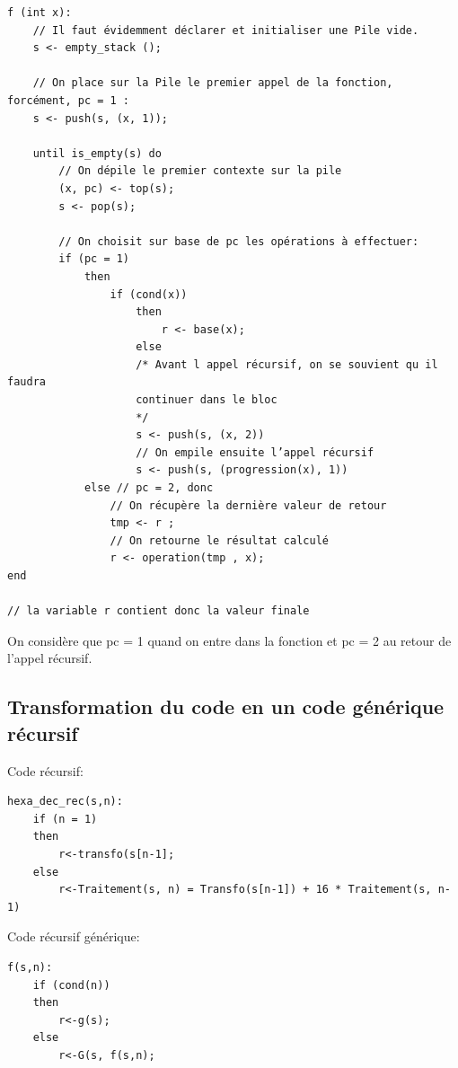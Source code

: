 \documentclass[a4paper, 11pt, oneside]{article}
\begin{document}
\begin{lstlisting}
f (int x):
    // Il faut évidemment déclarer et initialiser une Pile vide.
    s <- empty_stack ();

    // On place sur la Pile le premier appel de la fonction, forcément, pc = 1 :
    s <- push(s, (x, 1));

    until is_empty(s) do
        // On dépile le premier contexte sur la pile
        (x, pc) <- top(s);
        s <- pop(s);

        // On choisit sur base de pc les opérations à effectuer:
        if (pc = 1)
            then
                if (cond(x))
                    then
                        r <- base(x);
                    else
                    /* Avant l appel récursif, on se souvient qu il faudra
                    continuer dans le bloc
                    */
                    s <- push(s, (x, 2))
                    // On empile ensuite l’appel récursif
                    s <- push(s, (progression(x), 1))
            else // pc = 2, donc
                // On récupère la dernière valeur de retour
                tmp <- r ;
                // On retourne le résultat calculé
                r <- operation(tmp , x);
end

// la variable r contient donc la valeur finale
\end{lstlisting}

On considère que pc = 1 quand on entre dans la fonction et pc = 2 au retour de
l’appel récursif.


\subsection{Transformation du code en un code générique récursif}

\begin{center}
    Code récursif:
\end{center}
\begin{lstlisting}
hexa_dec_rec(s,n):
    if (n = 1)
    then
        r<-transfo(s[n-1];
    else
        r<-Traitement(s, n) = Transfo(s[n-1]) + 16 * Traitement(s, n-1)
\end{lstlisting}

\begin{center}
    Code récursif générique:
\end{center}
\begin{lstlisting}
f(s,n):
    if (cond(n))
    then
        r<-g(s);
    else
        r<-G(s, f(s,n);
\end{lstlisting}
\end{document}
